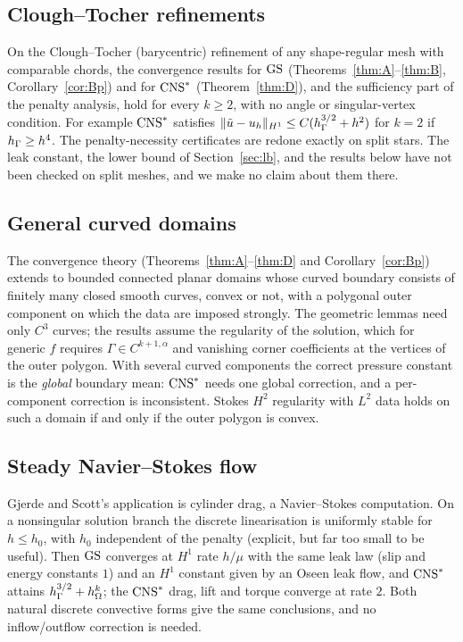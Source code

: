 \subsection{Clough--Tocher refinements}
On the Clough--Tocher (barycentric) refinement of any shape-regular mesh with comparable chords, the convergence results for $\mathrm{GS}$ (Theorems~\ref{thm:A}--\ref{thm:B}, Corollary~\ref{cor:Bp}) and for $\mathrm{CNS}^\ast$ (Theorem~\ref{thm:D}), and the sufficiency part of the penalty analysis, hold for every $k\ge2$, with no angle or singular-vertex condition. For example $\mathrm{CNS}^\ast$ satisfies $\lVert \tilde u-u_h\rVert_{H^1}\le C(h_\Gamma^{3/2}+h^2)$ for $k=2$ if $h_\Gamma\ge h^4$. The penalty-necessity certificates are redone exactly on split stars. The leak constant, the lower bound of Section~\ref{sec:lb}, and the results below have not been checked on split meshes, and we make no claim about them there.

\subsection{General curved domains}
The convergence theory (Theorems~\ref{thm:A}--\ref{thm:D} and Corollary~\ref{cor:Bp}) extends to bounded connected planar domains whose curved boundary consists of finitely many closed smooth curves, convex or not, with a polygonal outer component on which the data are imposed strongly. The geometric lemmas need only $C^3$ curves; the results assume the regularity of the solution, which for generic $f$ requires $\Gamma\in C^{k+1,\alpha}$ and vanishing corner coefficients at the vertices of the outer polygon. With several curved components the correct pressure constant is the \emph{global} boundary mean: $\mathrm{CNS}^\ast$ needs one global correction, and a per-component correction is inconsistent. Stokes $H^2$ regularity with $L^2$ data holds on such a domain if and only if the outer polygon is convex.

\subsection{Steady Navier--Stokes flow}
Gjerde and Scott's application is cylinder drag, a Navier--Stokes computation. On a nonsingular solution branch the discrete linearisation is uniformly stable for $h\le h_0$, with $h_0$ independent of the penalty (explicit, but far too small to be useful). Then $\mathrm{GS}$ converges at $H^1$ rate $h/\mu$ with the same leak law (slip and energy constants $1$) and an $H^1$ constant given by an Oseen leak flow, and $\mathrm{CNS}^\ast$ attains $h_\Gamma^{3/2}+h_\Omega^k$; the $\mathrm{CNS}^\ast$ drag, lift and torque converge at rate $2$. Both natural discrete convective forms give the same conclusions, and no inflow/outflow correction is needed.

